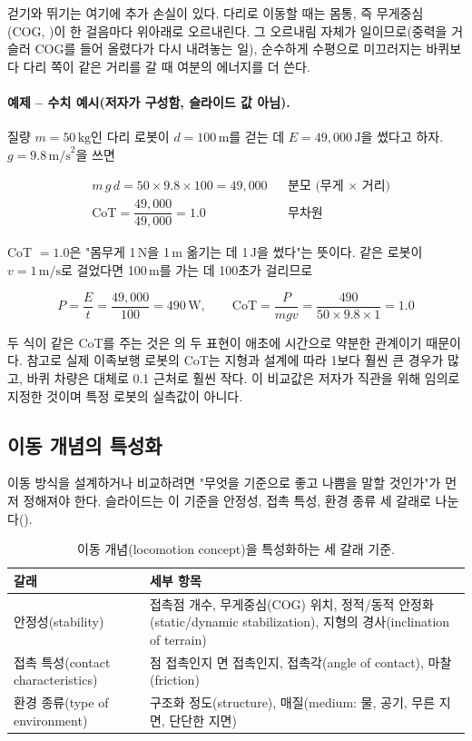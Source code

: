 걷기와 뛰기는 여기에 추가 손실이 있다. 다리로 이동할 때는 몸통, 즉 무게중심
(COG, )이 한 걸음마다 위아래로 오르내린다. 그 오르내림
자체가 일이므로(중력을 거슬러 COG를 들어 올렸다가 다시 내려놓는 일), 순수하게
수평으로 미끄러지는 바퀴보다 다리 쪽이 같은 거리를 갈 때 여분의 에너지를 더
쓴다.

\paragraph{예제 -- 수치 예시(저자가 구성함, 슬라이드 값 아님).}
질량 $m = 50\,\text{kg}$인 다리 로봇이 $d = 100\,\text{m}$를 걷는 데
$E = 49{,}000\,\text{J}$을 썼다고 하자. $g = 9.8\,\text{m/s}^2$을 쓰면

\begin{align*}
&m\,g\,d = 50 \times 9.8 \times 100 = 49{,}000 && \text{분모 (무게 $\times$ 거리)}\\
&\mathrm{CoT} = \dfrac{49{,}000}{49{,}000} = 1.0 && \text{무차원}
\end{align*}

CoT $=1.0$은 "몸무게 1\,N을 1\,m 옮기는 데 1\,J을 썼다"는 뜻이다. 같은 로봇이
$v = 1\,\text{m/s}$로 걸었다면 100\,m를 가는 데 100초가 걸리므로

\[
P = \frac{E}{t} = \frac{49{,}000}{100} = 490\,\text{W}, \qquad
\mathrm{CoT} = \frac{P}{m g v} = \frac{490}{50 \times 9.8 \times 1} = 1.0
\]

두 식이 같은 CoT를 주는 것은 의 두 표현이 애초에 시간으로
약분한 관계이기 때문이다. 참고로 실제 이족보행 로봇의 CoT는 지형과 설계에 따라
1보다 훨씬 큰 경우가 많고, 바퀴 차량은 대체로 0.1 근처로 훨씬 작다. 이 비교값은
저자가 직관을 위해 임의로 지정한 것이며 특정 로봇의 실측값이 아니다.

\subsection{이동 개념의 특성화}
\label{sec:lec02-characterization}

이동 방식을 설계하거나 비교하려면 "무엇을 기준으로 좋고 나쁨을 말할 것인가"가
먼저 정해져야 한다. 슬라이드는 이 기준을 안정성, 접촉 특성, 환경 종류 세
갈래로 나눈다().

\begin{table}[ht]
\centering
\caption{이동 개념(locomotion concept)을 특성화하는 세 갈래 기준.}
\label{tab:lec02-characterization}
\begin{tabularx}{\linewidth}{@{}lL@{}}
\toprule
갈래 & 세부 항목 \\
\midrule
안정성(stability) & 접촉점 개수, 무게중심(COG) 위치, 정적/동적 안정화
  (static/dynamic stabilization), 지형의 경사(inclination of terrain) \\
접촉 특성(contact characteristics) & 점 접촉인지 면 접촉인지, 접촉각(angle of
  contact), 마찰(friction) \\
환경 종류(type of environment) & 구조화 정도(structure), 매질(medium: 물,
  공기, 무른 지면, 단단한 지면) \\
\bottomrule
\end{tabularx}
\end{table}

